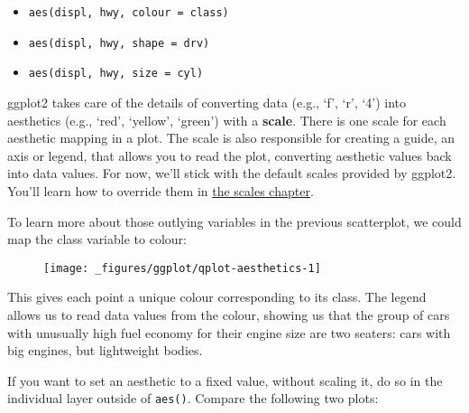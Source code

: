 \begin{itemize}
\tightlist
\item
  \texttt{aes(displ,\ hwy,\ colour\ =\ class)}
\item
  \texttt{aes(displ,\ hwy,\ shape\ =\ drv)}
\item
  \texttt{aes(displ,\ hwy,\ size\ =\ cyl)}
\end{itemize}

ggplot2 takes care of the details of converting data (e.g., `f', `r',
`4') into aesthetics (e.g., `red', `yellow', `green') with a
\textbf{scale}. There is one scale for each aesthetic mapping in a plot.
The scale is also responsible for creating a guide, an axis or legend,
that allows you to read the plot, converting aesthetic values back into
data values. For now, we'll stick with the default scales provided by
ggplot2. You'll learn how to override them in
\protect\hyperlink{cha:scales}{the scales chapter}.

To learn more about those outlying variables in the previous
scatterplot, we could map the class variable to colour:

\begin{Shaded}
\begin{Highlighting}[]
\OperatorTok{+}\StringTok{ }
\StringTok{  }\NormalTok{()}
\end{Highlighting}
\end{Shaded}

\begin{figure}[H]
  \centering
  \texttt{[image: \_figures/ggplot/qplot-aesthetics-1]}
\end{figure}

This gives each point a unique colour corresponding to its class. The
legend allows us to read data values from the colour, showing us that
the group of cars with unusually high fuel economy for their engine size
are two seaters: cars with big engines, but lightweight bodies.

If you want to set an aesthetic to a fixed value, without scaling it, do
so in the individual layer outside of \texttt{aes()}. Compare the
following two plots: 

\begin{Shaded}
\begin{Highlighting}[]
\OperatorTok{+}\StringTok{ }\NormalTok{(}\NormalTok{(} \NormalTok{))}
\OperatorTok{+}\StringTok{ }\NormalTok{(} \NormalTok{)}
\end{Highlighting}
\end{Shaded}

